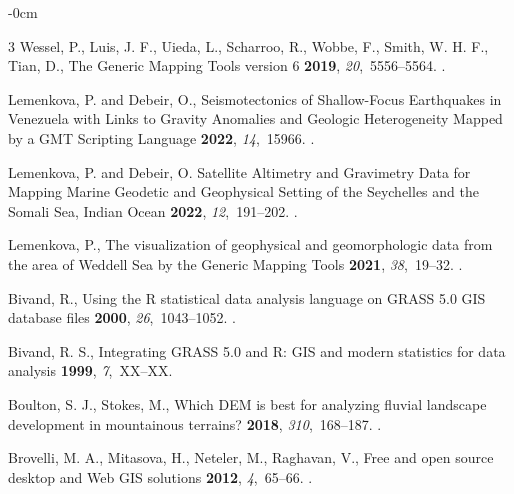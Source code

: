 \documentclass[technologies,article,submit,pdftex,moreauthors]{Definitions/mdpi}
\begin{document}
\begin{adjustwidth}{-\extralength}{0cm}
\begin{thebibliography}{3}
Wessel, P., Luis, J. F., Uieda, L., Scharroo, R., Wobbe, F., Smith, W. H. F., Tian, D., 
\newblock The Generic Mapping Tools version 6
 {\bf 2019}, {\em 20},~5556--5564. 
.

Lemenkova, P. and Debeir, O.,
\newblock Seismotectonics of Shallow-Focus Earthquakes in Venezuela with Links to Gravity Anomalies and Geologic Heterogeneity Mapped by a GMT Scripting Language
 {\bf 2022}, {\em 14},~15966. 
.

Lemenkova, P. and Debeir, O. 
\newblock Satellite Altimetry and Gravimetry Data for Mapping Marine Geodetic and Geophysical Setting of the Seychelles and the Somali Sea, Indian Ocean
 {\bf 2022}, {\em 12},~191--202. 
.

Lemenkova, P.,
\newblock The visualization of geophysical and geomorphologic data from the area of Weddell Sea by the Generic Mapping Tools
 {\bf 2021}, {\em 38},~19--32. 
.

Bivand, R.,
\newblock Using the R statistical data analysis language on GRASS 5.0 GIS database files
 {\bf 2000}, {\em 26},~1043--1052. 
.

 Bivand, R. S., 
\newblock Integrating GRASS 5.0 and R: GIS and modern statistics for data analysis
 {\bf 1999}, {\em 7},~XX--XX. 

Boulton, S. J., Stokes, M., 
\newblock Which DEM is best for analyzing fluvial landscape development in mountainous terrains?
 {\bf 2018}, {\em 310},~168--187. 
.
 
Brovelli, M. A., Mitasova, H., Neteler, M., Raghavan, V., 
\newblock Free and open source desktop and Web GIS solutions
 {\bf 2012}, {\em 4},~65--66. 
.


\end{thebibliography}
\end{adjustwidth}
\end{document}
